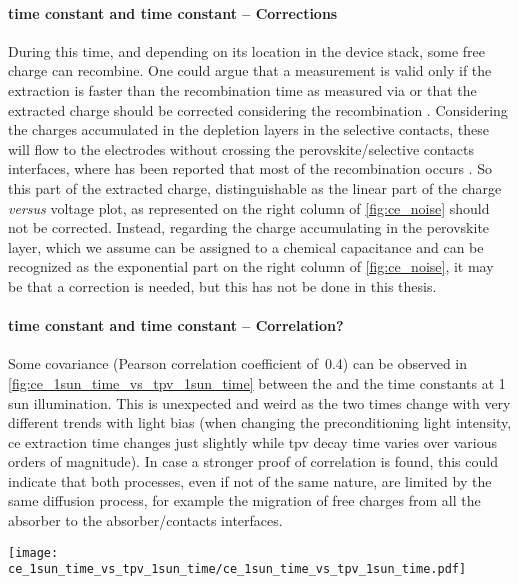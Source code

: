 		\paragraph{ time constant and  time constant -- Corrections}
		During this time, and depending on its location in the device stack, some free charge can recombine.
		One could argue that a  measurement is valid only if the extraction is faster than the recombination time as measured via  \cite{Ryan2017a} or that the extracted charge should be corrected considering the recombination \cite{Credgington2011,Credgington2014}.
		Considering the charges accumulated in the depletion layers in the selective contacts, these will flow to the electrodes without crossing the perovskite/selective contacts interfaces, where has been reported that most of the recombination occurs \cite{Barnea-Nehoshtan2014,Stolterfoht2018a,Stolterfoht2018}.
		So this part of the extracted charge, distinguishable as the linear part of the charge \textit{versus} voltage plot, as represented on the right column of \cref{fig:ce_noise} should not be corrected.
		Instead, regarding the charge accumulating in the perovskite layer, which we assume can be assigned to a chemical capacitance and can be recognized as the exponential part on the right column of \cref{fig:ce_noise}, it may be that a correction \cite{Shuttle2008a,Shuttle2008b} is needed, but this has not be done in this thesis.

		\paragraph{ time constant and  time constant -- Correlation?}
		Some covariance (Pearson correlation coefficient of~0.4) can be observed in \cref{fig:ce_1sun_time_vs_tpv_1sun_time} between the  and the  time constants at 1 sun illumination.
		This is unexpected and weird as the two times change with very different trends with light bias (when changing the preconditioning light intensity, \gls{ce} extraction time changes just slightly while \gls{tpv} decay time varies over various orders of magnitude).
		In case a stronger proof of correlation is found, this could indicate that both processes, even if not of the same nature, are limited by the same diffusion process, for example the migration of free charges from all the absorber to the absorber/contacts interfaces.

		\begin{SCfigure}%
			\centering
			\texttt{[image: ce\_1sun\_time\_vs\_tpv\_1sun\_time/ce\_1sun\_time\_vs\_tpv\_1sun\_time.pdf]}
			\label{fig:ce_1sun_time_vs_tpv_1sun_time}
		\end{SCfigure}

